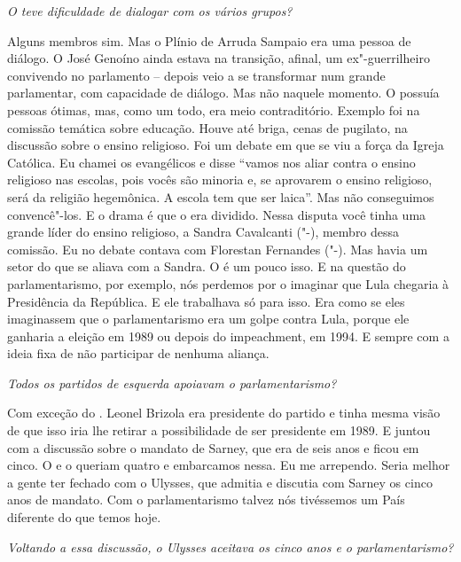 \medskip

\emph{O  teve dificuldade de dialogar com os vários grupos?}

Alguns membros sim. Mas o Plínio de Arruda Sampaio era
uma pessoa de diálogo. O José Genoíno ainda estava na transição, afinal,
um ex"-guerrilheiro convivendo no parlamento -- depois veio a se
transformar num grande parlamentar, com capacidade de diálogo. Mas não
naquele momento. O  possuía pessoas ótimas, mas, como um todo, era
meio contraditório. Exemplo foi na comissão temática sobre educação.
Houve até briga, cenas de pugilato, na discussão sobre o ensino
religioso. Foi um debate em que se viu a força da Igreja Católica. Eu
chamei os evangélicos e disse ``vamos nos aliar contra o ensino
religioso nas escolas, pois vocês são minoria e, se aprovarem o ensino
religioso, será da religião hegemônica. A escola tem que ser laica''.
Mas não conseguimos convencê"-los. E o drama é que o  era dividido.
Nessa disputa você tinha uma grande líder do ensino religioso, a Sandra
Cavalcanti ("-), membro dessa comissão. Eu no debate contava com
Florestan Fernandes ("-). Mas havia um setor do  que se aliava com
a Sandra. O  é um pouco isso. E na questão do parlamentarismo, por
exemplo, nós perdemos por o  imaginar que Lula chegaria à Presidência
da República. E ele trabalhava só para isso. Era como se eles
imaginassem que o parlamentarismo era um golpe contra Lula, porque ele
ganharia a eleição em 1989 ou depois do impeachment, em 1994. E sempre
com a ideia fixa de não participar de nenhuma aliança.

\medskip

\emph{Todos os partidos de esquerda apoiavam o parlamentarismo?}

Com exceção do . Leonel Brizola era presidente do
partido e tinha mesma visão de que isso iria lhe retirar a possibilidade
de ser presidente em 1989. E juntou com a discussão sobre o mandato de
Sarney, que era de seis anos e ficou em cinco. O  e o  queriam
quatro e embarcamos nessa. Eu me arrependo. Seria melhor a gente ter
fechado com o Ulysses, que admitia e discutia com Sarney os cinco anos
de mandato. Com o parlamentarismo talvez nós tivéssemos um País
diferente do que temos hoje.

\medskip

\emph{Voltando a essa discussão, o Ulysses aceitava os cinco anos e o
parlamentarismo?}


